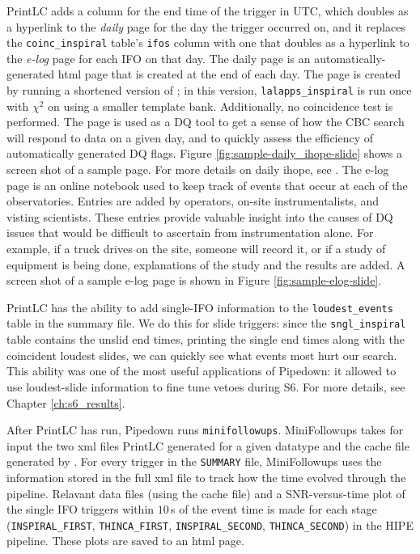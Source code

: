 PrintLC adds a column for the end time of the trigger in UTC, which doubles as a hyperlink to the \emph{daily} \ihope page for the day the trigger occurred on, and it replaces the \verb|coinc_inspiral| table's \verb|ifos| column with one that doubles as a hyperlink to the \emph{e-log} page for each \ac{IFO} on that day. The daily \ihope page is an automatically-generated html page that is created at the end of each day. The page is created by running a shortened version of \ihope; in this version, \verb|lalapps_inspiral| is run once with $\chi^2$ on using a smaller template bank. Additionally, no coincidence test is performed. The page is used as a \ac{DQ} tool to get a sense of how the \ac{CBC} search will respond to data on a given day, and to quickly assess the efficiency of automatically generated \ac{DQ} flags. Figure \ref{fig:sample-daily_ihope-slide} shows a screen shot of a sample page. For more details on daily ihope, see \cite{ref:Larne_thesis}. The e-log page is an online notebook used to keep track of events that occur at each of the observatories. Entries are added by operators, on-site instrumentalists, and visting scientists. These entries provide valuable insight into the causes of \ac{DQ} issues that would be difficult to ascertain from instrumentation alone. For example, if a truck drives on the site, someone will record it, or if a study of equipment is being done, explanations of the study and the results are added. A screen shot of a sample e-log page is shown in Figure \ref{fig:sample-elog-slide}.

PrintLC has the ability to add single-\ac{IFO} information to the \verb|loudest_events| table in the summary file. We do this for slide triggers: since the \verb|sngl_inspiral| table contains the unslid end times, printing the single end times along with the coincident loudest slides, we can quickly see what events most hurt our search. This ability was one of the most useful applications of Pipedown: it allowed to use loudest-slide information to fine tune vetoes during \ac{S6}. For more details, see Chapter \ref{ch:s6_results}.

After PrintLC has run, Pipedown runs \verb|minifollowups|. MiniFollowups takes for input the two xml files PrintLC generated for a given datatype and the cache file generated by \ihope. For every trigger in the \verb|SUMMARY| file, MiniFollowups uses the information stored in the full xml file to track how the time evolved through the pipeline. Relavant data files (using the cache file) and a \ac{SNR}-versus-time plot of the single \ac{IFO} triggers within $10\,$s of the event time is made for each stage (\verb|INSPIRAL_FIRST|, \verb|THINCA_FIRST|, \verb|INSPIRAL_SECOND|, \verb|THINCA_SECOND|) in the \ac{HIPE} pipeline. These plots are saved to an html page.

